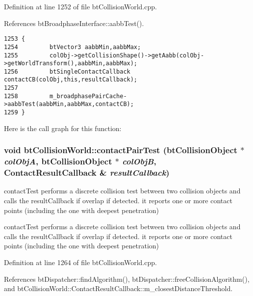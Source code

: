 Definition at line 1252 of file btCollisionWorld.cpp.

References btBroadphaseInterface::aabbTest().

\begin{Code}\begin{verbatim}1253 {
1254         btVector3 aabbMin,aabbMax;
1255         colObj->getCollisionShape()->getAabb(colObj->getWorldTransform(),aabbMin,aabbMax);
1256         btSingleContactCallback contactCB(colObj,this,resultCallback);
1257         
1258         m_broadphasePairCache->aabbTest(aabbMin,aabbMax,contactCB);
1259 }
\end{verbatim}
\end{Code}




Here is the call graph for this function:\hypertarget{classbt_collision_world_abbec542dcd348041db6d07b36a640c8}{
\subsubsection[contactPairTest]{\setlength{\rightskip}{0pt plus 5cm}void btCollisionWorld::contactPairTest (btCollisionObject $\ast$ {\em colObjA}, \/  btCollisionObject $\ast$ {\em colObjB}, \/  {\bf ContactResultCallback} \& {\em resultCallback})}}
\label{classbt_collision_world_abbec542dcd348041db6d07b36a640c8}


contactTest performs a discrete collision test between two collision objects and calls the resultCallback if overlap if detected. it reports one or more contact points (including the one with deepest penetration)

contactTest performs a discrete collision test between two collision objects and calls the resultCallback if overlap if detected. it reports one or more contact points (including the one with deepest penetration) 

Definition at line 1264 of file btCollisionWorld.cpp.

References btDispatcher::findAlgorithm(), btDispatcher::freeCollisionAlgorithm(), and btCollisionWorld::ContactResultCallback::m\_\-closestDistanceThreshold.

